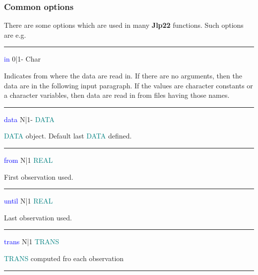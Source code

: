 {\subsubsection{Common options} 
\label{comoptions} 
There are some options which are used in many \textbf{Jlp22} functions. Such options are e.g. 
\vspace{0.3cm} 
\hrule 
\vspace{0.3cm} 
\noindent \textcolor{blue}{in} \tabto{3cm} 0|1- \tabto{5cm}  Char \tabto{7cm} 
\begin{changemargin}{3cm}{0cm} 
\noindent Indicates from where the data are read in. If there are no arguments, 
then the data are in the following input paragraph. If the values are 
character constants or a character variables, then data are read in from 
files having those names. 
\end{changemargin} 
\vspace{0.3cm} 
\hrule 
\vspace{0.3cm} 
\noindent \textcolor{blue}{data}  \tabto{3cm}  N|1-  \tabto{5cm}   \textcolor{teal}{DATA}  \tabto{7cm} 
\begin{changemargin}{3cm}{0cm} 
\noindent 	\textcolor{teal}{DATA} object. Default last \textcolor{teal}{DATA} defined. 
\end{changemargin} 
\vspace{0.3cm} 
\hrule 
\vspace{0.3cm} 
\noindent \textcolor{blue}{from} \tabto{3cm} N|1 \tabto{5cm}  \textcolor{teal}{REAL} \tabto{7cm} 
\begin{changemargin}{3cm}{0cm} 
\noindent  First observation used. 
\end{changemargin} 
\vspace{0.3cm} 
\hrule 
\vspace{0.3cm} 
\noindent \textcolor{blue}{until} \tabto{3cm} N|1 \tabto{5cm}  \textcolor{teal}{REAL} \tabto{7cm} 
\begin{changemargin}{3cm}{0cm} 
\noindent  Last observation used. 
\end{changemargin} 
\vspace{0.3cm} 
\hrule 
\vspace{0.3cm} 
\noindent \textcolor{blue}{trans} \tabto{3cm} N|1 \tabto{5cm}  \textcolor{teal}{TRANS} \tabto{7cm} 
\begin{changemargin}{3cm}{0cm} 
\noindent  \textcolor{teal}{TRANS} computed fro each observation 
\end{changemargin} 
\vspace{0.3cm} 
\hrule 
\vspace{0.3cm} 
}
